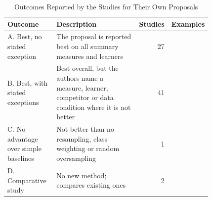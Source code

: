 \begin{table}[t]
  \caption{Outcomes Reported by the Studies for Their Own Proposals}
  \label{tab:empirical-outcomes}
  \footnotesize
  \setlength{\tabcolsep}{4pt}
  \begin{tabular}{@{}p{0.24\linewidth}p{0.4\linewidth}rp{0.18\linewidth}@{}}
    \toprule
    Outcome & Description & Studies & Examples\\
    \midrule
    A. Best, no stated exception & The proposal is reported best on all summary measures and learners & 27 & \parencite{douzas2018kmeans,chen2021hde,yan2025gdhs}\\
    B. Best, with stated exceptions & Best overall, but the authors name a measure, learner, competitor or data condition where it is not better & 41 & \parencite{seiffert2010rusboost,janicka2019soup,zhu2023orem}\\
    C. No advantage over simple baselines & Not better than no resampling, class weighting or random oversampling & 1 & \parencite{yadav2025ciso}\\
    D. Comparative study & No new method; compares existing ones & 2 & \parencite{buda2018systematic,fernandez2013analysing}\\
    \bottomrule
  \end{tabular}
\end{table}
